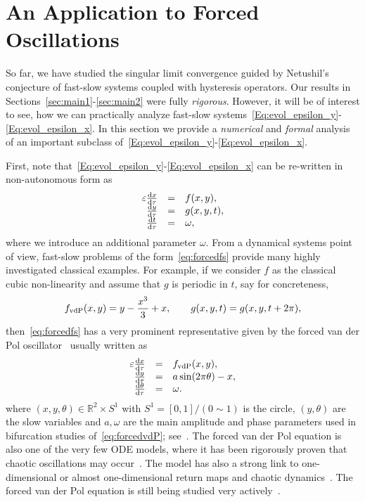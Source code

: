 \documentclass[12pt]{article}
\def\R{\mathbb{R}}
\def\txtd{{\textnormal{d}}}
\newcommand{\be}{\begin{equation}}
\newcommand{\ee}{\end{equation}}
\begin{document}
\section{An Application to Forced Oscillations}
\label{sec:appl}

So far, we have studied the singular limit convergence guided by Netushil's 
conjecture of fast-slow systems coupled with hysteresis operators. Our results in
Sections~\ref{sec:main1}-\ref{sec:main2} were fully \emph{rigorous}. However,
it will be of interest to see, how we can practically analyze fast-slow 
systems~\eqref{Eq:evol_epsilon_y}-\eqref{Eq:evol_epsilon_x}. In this section
we provide a \emph{numerical} and \emph{formal} analysis of an important
subclass of~\eqref{Eq:evol_epsilon_y}-\eqref{Eq:evol_epsilon_x}.\medskip

First, note that~\eqref{Eq:evol_epsilon_y}-\eqref{Eq:evol_epsilon_x} can 
be re-written in non-autonomous form as
\be
\label{eq:forcedfs}
\begin{array}{rcl}
\varepsilon \frac{\txtd x}{\txtd \tau} &=& f(x,y),\\
\frac{\txtd y}{\txtd \tau} &=& g(x,y,t),\\
\frac{\txtd t}{\txtd \tau} &=& \omega,
\end{array}
\ee
where we introduce an additional parameter $\omega$.
From a dynamical systems point of view, fast-slow problems of the 
form~\eqref{eq:forcedfs} provide many highly investigated classical examples. 
For example, if we consider $f$ as the classical cubic non-linearity and
assume that $g$ is periodic in $t$, say for concreteness, 
\be
f_{\textnormal{vdP}}(x,y)=y-\frac{x^3}{3}+x,\qquad g(x,y,t)=g(x,y,t+2\pi),
\ee
then~\eqref{eq:forcedfs} has a very prominent representative given by the
forced van der Pol oscillator~\cite{vanderPol2,KuehnBook,Guckenheimer2} usually 
written as
\be
\label{eq:forcedvdP}
\begin{array}{rcl}
\varepsilon \frac{\txtd x}{\txtd \tau} &=& f_{\textnormal{vdP}}(x,y),\\
\frac{\txtd y}{\txtd \tau} &=& a \sin(2\pi\theta )-x,\\
\frac{\txtd \theta}{\txtd \tau} &=& \omega. 
\end{array}
\ee
where $(x,y,\theta)\in\R^2\times S^1$ with $S^1=[0,1]/(0\sim 1)$ is the 
circle, $(y,\theta)$ are the slow variables and $a,\omega$ are the main 
amplitude and phase parameters used in bifurcation studies 
of~\eqref{eq:forcedvdP}; see~\cite{GuckenheimerHoffmanWeckesser2,Boldetal,
GrasmanNijmeijerVeling,SzmolyanWechselberger}. 
The forced van der Pol equation is also one of the very few ODE models,
where it has been rigorously proven that chaotic oscillations may 
occur~\cite{Haiduc1}. The model has also a strong link to one-dimensional
or almost one-dimensional return maps and chaotic 
dynamics~\cite{GuckenheimerWechselbergerYoung}. The forced van der Pol
equation is still being studied very actively~\cite{Burkeetal1}.\medskip
\end{document}
